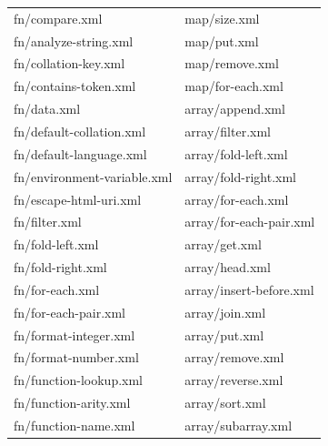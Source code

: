\begin{table}[]
	\centering
	\begin{tabular}{ll}
		fn/compare.xml                            & map/size.xml                               \\
		fn/analyze-string.xml                     & map/put.xml                                \\
		fn/collation-key.xml                      & map/remove.xml                             \\
		fn/contains-token.xml                     & map/for-each.xml                           \\
		fn/data.xml                               & array/append.xml                           \\
		fn/default-collation.xml                  & array/filter.xml                           \\
		fn/default-language.xml                   & array/fold-left.xml                        \\
		fn/environment-variable.xml               & array/fold-right.xml                       \\
		fn/escape-html-uri.xml                    & array/for-each.xml                         \\
		fn/filter.xml                             & array/for-each-pair.xml                    \\
		fn/fold-left.xml                          & array/get.xml                              \\
		fn/fold-right.xml                         & array/head.xml                             \\
		fn/for-each.xml                           & array/insert-before.xml                    \\
		fn/for-each-pair.xml                      & array/join.xml                             \\
		fn/format-integer.xml                     & array/put.xml                              \\
		fn/format-number.xml                      & array/remove.xml                           \\
		fn/function-lookup.xml                    & array/reverse.xml                          \\
		fn/function-arity.xml                     & array/sort.xml                             \\
		fn/function-name.xml                      & array/subarray.xml                         \\

\end{tabular}
\end{table}
